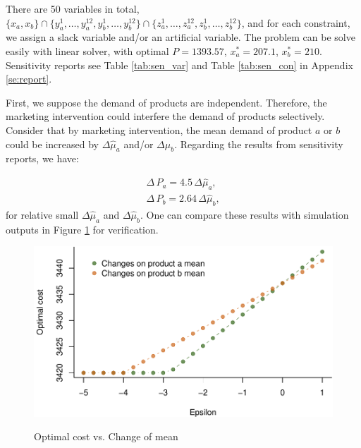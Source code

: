\documentclass[a4paper,11pt]{article}
\begin{document}
\begin{table}[ht]
\caption{Demand Realisations: Statistical Summary}
\label{tab:summary}
\centering
{}
\end{table}

There are 50 variables in total, $\big\{ x_a,x_b \big\} \cap \big\{ y_a^1,\dots,y_a^{12},y_b^1,\dots,y_b^{12} \big\} \cap \big\{ z_a^1,\dots,z_a^{12},z_b^1,\dots,z_b^{12} \big\}$, and for each constraint, we assign a slack variable and/or an artificial variable. The problem can be solve easily with linear solver, with optimal $P=1393.57$, $x_a^*=207.1$, $x_b^*=210$. Sensitivity reports see Table \ref{tab:sen_var} and Table \ref{tab:sen_con} in Appendix \ref{se:report}.

First, we suppose the demand of products are independent. Therefore, the marketing intervention could interfere the demand of products selectively. Consider that by marketing intervention, the mean demand of product $a$ or $b$ could be increased by $\Delta \hat{\mu}_a$ and/or $\Delta \hat{\mu}_b$. Regarding the results from sensitivity reports, we have:

\[
\begin{aligned}
    \Delta \, P_a = 4.5 \, \Delta \hat{\mu}_a,\\
    \Delta \, P_b = 2.64 \, \Delta \hat{\mu}_b,
\end{aligned}
\]
for relative small $\Delta \hat{\mu}_a$ and $\Delta \hat{\mu}_b$. One can compare these results with simulation outputs in Figure \ref{fig:mean} for verification.

\begin{figure}[htb]
\centering
\caption{Optimal cost vs. Change of mean}
\includegraphics{Example-figure_files/figure-latex/mean-1.pdf}
\label{fig:mean}
\end{figure}
\end{document}
